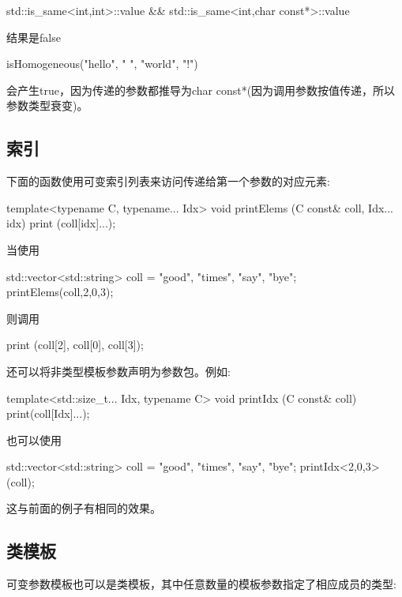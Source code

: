\begin{cpp}
std::is_same<int,int>::value && std::is_same<int,char const*>::value
\end{cpp}

结果是false

\begin{cpp}
isHomogeneous("hello", " ", "world", "!")
\end{cpp}

会产生true，因为传递的参数都推导为char const*(因为调用参数按值传递，所以参数类型衰变)。

\subsection{索引}

下面的函数使用可变索引列表来访问传递给第一个参数的对应元素:

\begin{cpp}
template<typename C, typename... Idx>
void printElems (C const& coll, Idx... idx)
{
	print (coll[idx]...);
}
\end{cpp}

当使用

\begin{cpp}
std::vector<std::string> coll = {"good", "times", "say", "bye"};
printElems(coll,2,0,3);
\end{cpp}

则调用

\begin{shell}
print (coll[2], coll[0], coll[3]);
\end{shell}

还可以将非类型模板参数声明为参数包。例如:

\begin{cpp}
template<std::size_t... Idx, typename C>
void printIdx (C const& coll)
{
	print(coll[Idx]...);
}
\end{cpp}

也可以使用

\begin{cpp}
std::vector<std::string> coll = {"good", "times", "say", "bye"};
printIdx<2,0,3>(coll);
\end{cpp}

这与前面的例子有相同的效果。

\subsection{类模板}

可变参数模板也可以是类模板，其中任意数量的模板参数指定了相应成员的类型:

